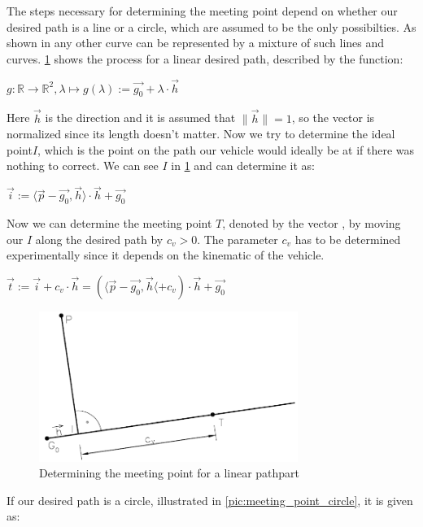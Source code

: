The steps necessary for determining the meeting point depend on whether our desired path is a line or a circle, which are assumed to be the only possibilties. As shown in \cite{12} any other curve can be represented by a mixture of such lines and curves.
\ref{pic:meeting_point_linear} shows the process for a linear desired path, described by the function:
\begin{center}
$g:\mathbb{R} \to \mathbb{R}^2 , \lambda \mapsto g(\lambda ) := \vec{g_0} + \lambda \cdot \vec{h}$
\end{center}
Here $\vec{h}$ is the direction and it is assumed that $\|\vec{h}\|=1$, so the vector is normalized since its length doesn't matter. Now we try to determine the ideal point$I$, which is the point on the path our vehicle would ideally be at if there was nothing to correct. We can see $I$ in \ref{pic:meeting_point_linear} and can determine it as:
\begin{center}
$\vec{i}:= \langle \vec{p}-\vec{g_0}, \vec{h} \rangle \cdot \vec{h} + \vec{g_0}$
\end{center}
Now we can determine the meeting point $T$, denoted by the vector , by moving our $I$ along the desired path by $c_v>0$. The parameter $c_v$ has to be determined experimentally since it depends on the kinematic of the vehicle.
\begin{center}
$\vec{t}:=\vec{i}+c_v \cdot \vec{h} = ( \langle \vec{p} - \vec{g_0}, \vec{h} \langle + c_v) \cdot \vec{h} + \vec{g_0}$
\end{center}

\begin{figure}[h]
\centering
\includegraphics[width=0.75\textwidth]{./Chapters/Figures/meeting_point_linear.png}
\caption{Determining the meeting point for a linear pathpart\label{pic:meeting_point_linear}}
\end{figure}

If our desired path is a circle, illustrated in \ref{pic:meeting_point_circle}, it is given as:

